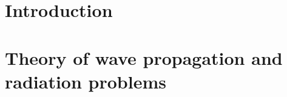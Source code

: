 \documentclass[%
	paper=A4,					%
	twoside=true,				%
	openright,					%
	chapterprefix=true,			%
	11pt,						%
	headings=normal,			%
	bibliography=totoc,			%
	listof=totoc,				%
	titlepage=on,				%
	captions=tableabove,		%
	draft=false,				%
]{scrreprt}
\begin{document}



\pagestyle{empty}				%
\cleardoublepage

%

\cleardoublepage

\pagestyle{plain}				%
\setcounter{tocdepth}{2}		%
\tableofcontents				%
\cleardoublepage
{}			%
\setcounter{page}{1}			%
\pagestyle{maincontentstyle} 	%

%

\chapter{Introduction}
%
%
\chapter{Theory of wave propagation and radiation problems}
\label{sec:general_wave_theory}

%
%
%
%
%
%
%
%
\end{document}
